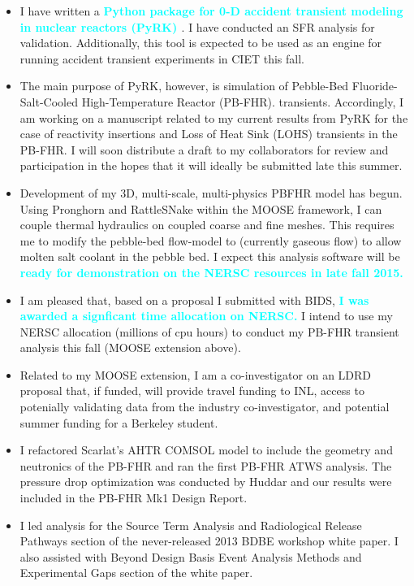 \documentclass[a4paper, 10pt]{article}
\newcommand{\myitem}[1]{\item[\textcolor{gray}{\textbf{#1}}]}
\newcommand{\boldblue}[1]{\textcolor{cyan}{\textbf{#1}}}
\begin{document}
\begin{itemize}
\myitem{PyRK} I have written a \boldblue{Python package for 0-D accident transient 
modeling in nuclear reactors (PyRK) \cite{huff_pyrk_2015}}. I have conducted an 
SFR analysis for validation. Additionally, this tool is expected to be 
used as an engine for running accident transient experiments in CIET this fall. 
\myitem{PB-FHR Analysis} The main purpose of PyRK, however, is simulation of 
Pebble-Bed Fluoride-Salt-Cooled High-Temperature Reactor (PB-FHR).  transients.  
Accordingly, I am working on a manuscript related to my current results from 
PyRK for the case of reactivity insertions and Loss of Heat Sink (LOHS) 
transients in the PB-FHR. I will soon distribute a draft to my collaborators 
for review and participation in the hopes that it will ideally be submitted 
late this summer.
\myitem{MOOSE Extension} Development of my 3D, multi-scale, multi-physics PBFHR 
model has begun. Using Pronghorn and RattleSNake within the MOOSE framework, I 
can couple thermal hydraulics on coupled coarse and fine meshes. This requires 
me to modify the pebble-bed flow-model to (currently gaseous flow) to allow 
molten salt coolant in the pebble bed. I expect this analysis software will be 
\boldblue{ready for demonstration on the  NERSC resources in late fall 2015.} 
\myitem{NERSC} I am pleased that, based on a proposal I submitted with BIDS, 
\boldblue{I was awarded a signficant time allocation on NERSC.} I intend to 
use my NERSC allocation (millions of cpu hours) to conduct my PB-FHR transient 
analysis this fall (MOOSE extension above).
\myitem{INL LDRD} Related to my MOOSE extension, I am a co-investigator on an 
LDRD proposal that, if funded, will provide travel funding to INL, access to 
potenially validating data from the industry co-investigator, and potential 
summer funding for a Berkeley student.
\myitem{COMSOL ATWS} I refactored Scarlat's AHTR COMSOL model to include the geometry 
and neutronics of the PB-FHR and ran the first PB-FHR ATWS analysis. The 
pressure drop optimization was conducted by Huddar and our results were 
included in the PB-FHR Mk1 Design Report.  
\myitem{BDBE Workshop} I led analysis for the Source Term Analysis and 
Radiological Release Pathways section of the never-released 2013 BDBE workshop 
white paper. I also assisted with Beyond Design Basis Event Analysis 
Methods and Experimental Gaps section of the white paper.
\end{itemize}
\end{document}
